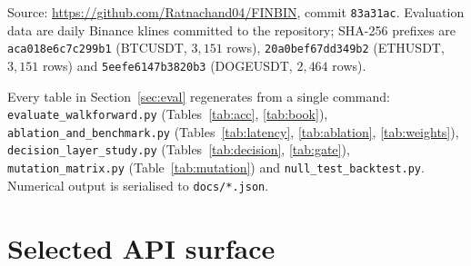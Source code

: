 \documentclass[preprint,12pt,authoryear]{elsarticle}
\begin{document}
Source: \url{https://github.com/Ratnachand04/FINBIN}, commit
\texttt{83a31ac}. Evaluation data are daily Binance klines committed to the
repository; SHA-256 prefixes are \texttt{aca018e6c7c299b1} (BTCUSDT, $3{,}151$
rows), \texttt{20a0bef67dd349b2} (ETHUSDT, $3{,}151$ rows) and
\texttt{5eefe6147b3820b3} (DOGEUSDT, $2{,}464$ rows).

Every table in Section~\ref{sec:eval} regenerates from a single command:
\texttt{evaluate\_walkforward.py} (Tables~\ref{tab:acc}, \ref{tab:book}),
\texttt{ablation\_and\_benchmark.py} (Tables~\ref{tab:latency},
\ref{tab:ablation}, \ref{tab:weights}), \texttt{decision\_layer\_study.py}
(Tables~\ref{tab:decision}, \ref{tab:gate}), \texttt{mutation\_matrix.py}
(Table~\ref{tab:mutation}) and \texttt{null\_test\_backtest.py}. Numerical
output is serialised to \texttt{docs/*.json}.

\appendix

\section{Selected API surface}
\label{app:api}
\end{document}
